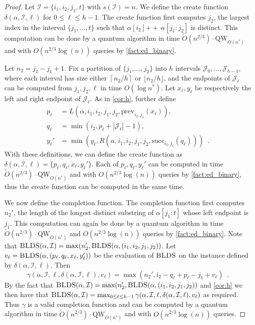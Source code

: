 \documentclass[12pt]{article}
\newcommand{\qw}{\mathrm{QW}}
\newcommand{\floor}[1]{\lfloor #1 \rfloor}
\newcommand{\ceil}[1]{\left\lceil #1 \right\rceil}
\newcommand{\concat}{\ensuremath{+\!\!\!\!+\,}}
\newcommand{\Iset}{\mathcal{I}}
\newcommand{\indices}{\mathcal{I}}
\newcommand{\Jset}{\mathcal{J}}
\newcommand{\blds}{\textsc{BLDS}}
\newcommand{\prev}{\mathrm{prev}}
\newcommand{\suc}{\mathrm{succ}}
\newcommand{\upto}{\mathbin{:}}
\theoremstyle{definition}
\begin{document}
\begin{proof}
Let $\indices = \{i_1, i_2, j_1, t\}$ with $s(\Iset)=n$.  We define the create function $\delta(\alpha, \indices, \ell)$ for $0 \le \ell \le h-1$.  The create function first computes $j_2$, the largest index in the interval $\{j_1,\ldots, t\}$ such that 
$\alpha[i_2] \concat \alpha[j_1 \upto j_2]$ is distinct.  This computation can be done by a quantum algorithm in time $\tilde O(n^{2/3}) \cdot \qw_{O(n^*)}$ and with $O(n^{2/3} \log(n))$ queries by \cref{fact:ed_binary}.

Let $n_2 = j_2 - j_1 + 1$.  Fix a partition of $\{j_1, \ldots, j_2\}$ into $h$ intervals $\Jset_0, \ldots, \Jset_{h-1}$, where each interval has size either $\ceil{n_2/h}$ or $\floor{n_2/h}$, and the endpoints of $\Jset_\ell$ can be computed from $j_1, j_2, \ell$ in time $O(\log n^*)$.  Let $x_\ell, y_\ell$ be respectively the left and right endpoint of $\Jset_\ell$.  As in \cref{cor:h}, further define 
\begin{align*}
p_\ell &= L(\alpha, i_1, i_2, j_1, j_2, \prev_{i_2, j_1}(x_\ell)), \\
q_\ell &= \min(i_2, p_\ell+|\Jset_\ell|-1), \\
y_\ell'&= \min(y_\ell, R(\alpha, i_1, i_2, j_1, j_2, \suc_{i_2, j_1}(q_\ell))) \enspace.
\end{align*}
With these definitions, we can define the create function as $\delta(\alpha, \Iset, \ell) = \{p_\ell, q_\ell, x_\ell, y_\ell'\}$.
Each of $p_\ell, q_\ell, y_\ell'$ can be computed in time $\tilde O(n^{2/3}) \cdot \qw_{O(n^*)}$ and with $O(n^{2/3} \log(n))$ queries by \cref{fact:ed_binary}, thus the create function can be computed in the same time.

We now define the completion function. The completion function first computes $n_2'$, the length of the longest distinct substring of $\alpha[j_1 \upto t]$ whose left endpoint is $j_1$.  This computation can again be done by a quantum algorithm in time $\widetilde O(n^{2/3}) \cdot \qw_{O(n^*)}$ and $O(n^{2/3} \log(n))$ queries by \cref{fact:ed_binary}.
Note that $\blds(\alpha, \Iset) = \max(n_2', \blds(\alpha, (i_1, i_2, j_1, j_2))$.
Let $v_\ell = \blds(\alpha, (p_\ell, q_\ell, x_\ell, y_\ell'))$ be the evaluation of $\blds$ on the instance defined by $\delta(\alpha, \Iset, \ell)$. Then 
\[
\gamma(\alpha, \Iset, \ell, \delta(\alpha, \Iset, \ell), v_\ell) = 
\max(n_2', i_2 - q_\ell + p_\ell - j_1 + v_\ell) \enspace.
\]
By the fact that $\blds(\alpha, \Iset) = \max(n_2', \blds(\alpha, (i_1, i_2, j_1, j_2))$ and \cref{cor:h} we then have that 
$\blds(\alpha, \Iset) = \max_{0 \le \ell \le h-1} \gamma(\alpha, \Iset, \ell, \delta(\alpha, \Iset, \ell), v_\ell)$ as required.  Thus $\gamma$ is a valid completion function and can be computed by a quantum algorithm in time $\widetilde O(n^{2/3}) \cdot \qw_{O(n^*)}$ and with $O(n^{2/3} \log(n))$ queries. 
\end{proof}
\end{document}
